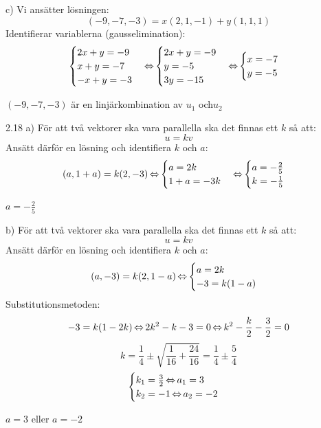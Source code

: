 \begin{task}{c)}
	Vi ansätter lösningen:
	\[(-9,-7,-3)=x(2,1,-1)+y(1,1,1)\]
	Identifierar variablerna (gausselimination):
	\[\begin{cases}
		2x+y=-9 \\
		x+y=-7 \\
		-x+y=-3
	\end{cases} \operatorname{\Leftrightarrow}
	\begin{cases}
		2x+y=-9 \\
		y=-5 \\
		3y=-15
	\end{cases} \operatorname{\Leftrightarrow}
	\begin{cases}
		x=-7 \\
		y=-5
	\end{cases}\]
	
	\ans $(-9,-7,-3)$ är en linjärkombination av $u_1$ och$u_2$
\end{task}

\begin{task}{2.18 a)}
	För att två vektorer ska vara parallella ska det finnas ett $k$ så att:
	\[u=kv\]
	Ansätt därför en lösning och identifiera $k$ och $a$:
	\[(a,1+a)=k(2,-3) \operatorname{\Leftrightarrow}
	\begin{cases}
		a=2k \\
		1+a=-3k
	\end{cases} \operatorname{\Leftrightarrow}
	\begin{cases}
		a=-\frac{2}{5} \\
		k=-\frac{1}{5}
	\end{cases}\]
	
	\ans $a=-\frac{2}{5}$
\end{task}

\begin{task}{b)}
	För att två vektorer ska vara parallella ska det finnas ett $k$ så att:
	\[u=kv\]
	Ansätt därför en lösning och identifiera $k$ och $a$:
	\[(a,-3)=k(2,1-a) \operatorname{\Leftrightarrow}
	\begin{cases}
		a=2k \\
		-3=k(1-a)
	\end{cases}\]
	Substitutionsmetoden:
	\[-3=k(1-2k) \operatorname{\Leftrightarrow}
	2k^2-k-3=0 \operatorname{\Leftrightarrow}
	k^2-\frac{k}{2}-\frac{3}{2}=0\]
	\[k=\frac{1}{4}\pm\sqrt{\frac{1}{16}+\frac{24}{16}}=\frac{1}{4}\pm\frac{5}{4}\]
	\[\begin{cases}
		k_1=\frac{3}{2} \operatorname{\Leftrightarrow} a_1=3 \\
		k_2=-1 \operatorname{\Leftrightarrow} a_2=-2
	\end{cases}\]
	
	\ans $a=3$ eller $a=-2$
\end{task}

